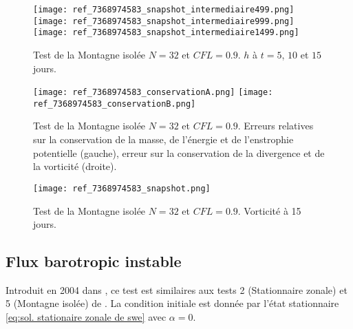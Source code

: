 \begin{figure}[htbp]
\begin{center}
\texttt{[image: ref\_7368974583\_snapshot\_intermediaire499.png]}\\
\texttt{[image: ref\_7368974583\_snapshot\_intermediaire999.png]}\\
\texttt{[image: ref\_7368974583\_snapshot\_intermediaire1499.png]}
\end{center}
\caption{Test de la Montagne isolée \cite{Williamson1992} $N=32$ et $CFL=0.9$. $h$ à $t=5$, $10$ et $15$ jours.}
\label{fig: williamson 5 space height}
\end{figure}

\begin{figure}[htbp]
\begin{center}
\texttt{[image: ref\_7368974583\_conservationA.png]}
\texttt{[image: ref\_7368974583\_conservationB.png]}
\end{center}
\caption{Test de la Montagne isolée \cite{Williamson1992} $N=32$ et $CFL=0.9$. Erreurs relatives sur la conservation de la masse, de l'énergie et de l'enstrophie potentielle (gauche), erreur sur la conservation de la divergence et de la vorticité (droite).}
\label{fig: williamson 5 conservation}
\end{figure}

\begin{figure}[htbp]
\begin{center}
\texttt{[image: ref\_7368974583\_snapshot.png]}
\end{center}
\caption{Test de la Montagne isolée \cite{Williamson1992} $N=32$ et $CFL=0.9$. Vorticité à 15 jours.}
\label{fig: williamson 5 vorticité}
\end{figure}



















\subsection{Flux barotropic instable}

Introduit en 2004 dans \cite{Galewsky2004}, ce test est similaires aux tests 2 (Stationnaire zonale) et 5 (Montagne isolée) de \cite{Williamson1992}. La condition initiale est donnée par l'état stationnaire \eqref{eq:sol. stationaire zonale de swe} avec $\alpha=0$.


